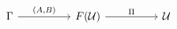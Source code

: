 \[\begin{tikzcd}
	\Gamma && {F(\Ty)} && \Ty
	\arrow["\Pi", from=1-3, to=1-5]
	\arrow["{(A, B)}", from=1-1, to=1-3]
\end{tikzcd}\]